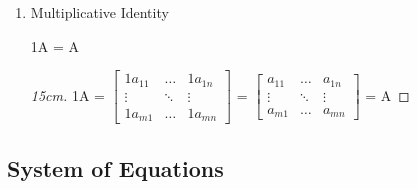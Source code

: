 \begin{enumerate}[label=(\alph*), leftmargin=2cm, itemsep=0.1cm]
            \hspace{0.5cm}
            $c_1(c_2)A$ = $(c_1c_2)A$

            \begin{proof}[15cm]
                $c_1(c_2)A$ =
                $\begin{bmatrix}
                    c_1c_2a_{11} & \hdots & c_1c_2a_{1n} \\
                    \vdots & \ddots & \vdots \\
                    c_1c_2a_{m1} & \hdots & c_1c_2a_{mn}
                \end{bmatrix}$
                = $(c_1c_2)A$
            \end{proof}

            \newpage

        \item {\color{lgreen} Multiplicative Identity}
        
            \hspace{0.5cm}
            1A = A

            \begin{proof}[15cm]
                1A =
                $\begin{bmatrix}
                    1a_{11} & \hdots & 1a_{1n} \\
                    \vdots & \ddots & \vdots \\
                    1a_{m1} & \hdots & 1a_{mn}
                \end{bmatrix}$ =
                $\begin{bmatrix}
                    a_{11} & \hdots & a_{1n} \\
                    \vdots & \ddots & \vdots \\
                    a_{m1} & \hdots & a_{mn}
                \end{bmatrix}$
                = A
            \end{proof}
    \end{enumerate}

    \vspace{0.5cm}





\subsection{ System of Equations }

